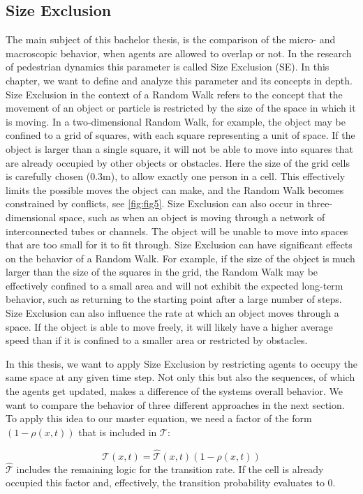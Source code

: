 \subsection{Size Exclusion}
The main subject of this bachelor thesis, is the comparison of the micro- and macroscopic behavior, when agents are allowed to overlap or not.
In the research of pedestrian dynamics this parameter is called Size Exclusion (SE). In this chapter, we want to define and analyze this parameter and its concepts in depth. 
Size Exclusion in the context of a Random Walk refers to the concept that the movement of an object or particle is restricted by the size of the space in which it is moving.
In a two-dimensional Random Walk, for example, the object may be confined to a grid of squares, with each square representing a unit of space. 
If the object is larger than a single square, it will not be able to move into squares that are already occupied by other objects or obstacles. 
Here the size of the grid cells is carefully chosen (0.3m), to allow exactly one person in a cell. 
This effectively limits the possible moves the object can make, and the Random Walk becomes constrained by conflicts, see \autoref{fig:fig5}.
Size Exclusion can also occur in three-dimensional space, such as when an object is moving through a network of interconnected tubes or channels. 
The object will be unable to move into spaces that are too small for it to fit through.
Size Exclusion can have significant effects on the behavior of a Random Walk. For example, if the size of the object is much larger than the size of the squares in the grid, 
the Random Walk may be effectively confined to a small area and will not exhibit the expected long-term behavior, such as returning to the starting point after a large number of steps.
Size Exclusion can also influence the rate at which an object moves through a space. If the object is able to move freely, 
it will likely have a higher average speed than if it is confined to a smaller area or restricted by obstacles.

In this thesis, we want to apply Size Exclusion by restricting agents to occupy the same space at any given time step.
Not only this but also the sequences, of which the agents get updated, makes a difference of the systems overall behavior.
We want to compare the behavior of three different approaches in the next section.
To apply this idea to our master equation, we need a factor of the form $(1- \rho(x,t))$ that is included in $\mathcal{T}$:

\begin{equation}
 \mathcal{T}(x,t) = \hat{\mathcal{T}}(x,t)(1- \rho(x,t)) 
\end{equation}
$\hat{\mathcal{T}}$ includes the remaining logic for the transition rate. 
If the cell is already occupied this factor and, effectively, the transition probability evaluates to 0. 


